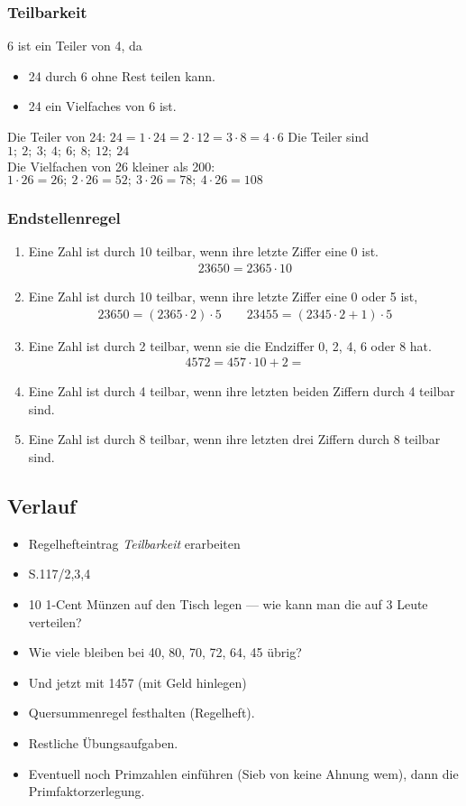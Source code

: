 \documentclass[parskip=half-,a4paper]{scrartcl} %
\begin{document}
\subsubsection{Teilbarkeit}
6 ist ein Teiler von 4, da
\begin{itemize}
	\item 24 durch 6 ohne Rest teilen kann.
	\item 24 ein Vielfaches von 6 ist.
\end{itemize}
Die Teiler von 24: $24 = 1\cdot 24 = 2 \cdot 12 = 3 \cdot 8 = 4\cdot 6$ Die
Teiler sind
$1;~2;~3;~4;~6;~8;~12;~24$\\
Die Vielfachen von 26 kleiner als 200:
$1\cdot 26 = 26;~2\cdot 26 = 52;~ 3\cdot 26=78;~4\cdot 26=108$

\subsubsection{Endstellenregel}
\begin{enumerate}
	\item Eine Zahl ist durch 10 teilbar, wenn ihre letzte Ziffer eine 0 ist.
		\begin{align*}
			23650 = 2365\cdot 10
		\end{align*}
	\item Eine Zahl ist durch 10 teilbar, wenn ihre letzte Ziffer eine 0 oder 5
		ist,
		\begin{align*}
			23650=(2365\cdot 2) \cdot 5
			\qquad
			23455 = (2345\cdot 2 + 1)\cdot 5
		\end{align*}
	\item Eine Zahl ist durch 2 teilbar, wenn sie die Endziffer 0, 2, 4, 6 oder 8
		hat.
		\begin{align*}
			4572 = 457 \cdot 10 + 2 = 
		\end{align*}
	\item Eine Zahl ist durch 4 teilbar, wenn ihre letzten beiden Ziffern durch 4
		teilbar sind.
	\item Eine Zahl ist durch 8 teilbar, wenn ihre letzten drei Ziffern durch 8
		teilbar sind.
\end{enumerate}
\subsection{Verlauf}
\begin{itemize}
	\item Regelhefteintrag \emph{Teilbarkeit} erarbeiten
	\item S.117/2,3,4
	\item 10 1-Cent Münzen auf den Tisch legen --- wie kann man die auf 3 Leute
		verteilen?
	\item Wie viele bleiben bei 40, 80, 70, 72, 64, 45 übrig?
	\item Und jetzt mit 1457 (mit Geld hinlegen)
	\item Quersummenregel festhalten (Regelheft).
	\item Restliche Übungsaufgaben.
	\item Eventuell noch Primzahlen einführen (Sieb von keine Ahnung wem), dann
		die Primfaktorzerlegung.
\end{itemize}
\end{document}
